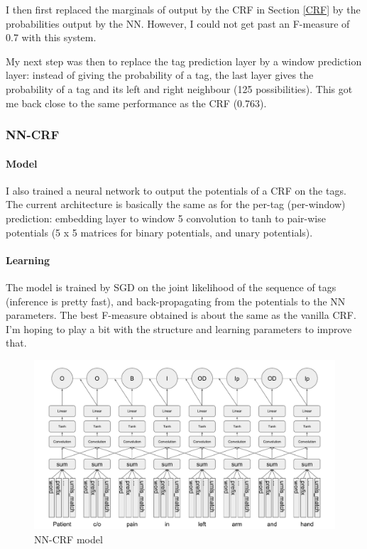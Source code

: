 \documentclass[10pt,a4paper]{article}
\begin{document}
  I then first replaced the marginals of output by the CRF in Section \ref{CRF} by the probabilities output by the NN. However, I could not get past an F-measure of 0.7 with this system.
  
  My next step was then to replace the tag prediction layer by a window prediction layer: instead of giving the probability of a tag, the last layer gives the probability of a tag and its left and right neighbour (125 possibilities). This got me back close to the same performance as the CRF (0.763).

\subsubsection{NN-CRF}

  \paragraph{Model}

  I also trained a neural network to output the potentials of a CRF on the tags. The current architecture is basically the same as for the per-tag (per-window) prediction: embedding layer to window 5 convolution to tanh to pair-wise potentials (5 x 5 matrices for binary potentials, and unary potentials).

  \paragraph{Learning} 
  
  The model is trained by SGD on the joint likelihood of the sequence of tags (inference is pretty fast), and back-propagating from the potentials to the NN parameters. The best F-measure obtained is about the same as the vanilla CRF. I'm hoping to play a bit with the structure and learning parameters to improve that.

\begin{figure}[h]  
\includegraphics[width=\textwidth]{NN-CRF.pdf}
\caption{NN-CRF model}
\end{figure}
\end{document}
